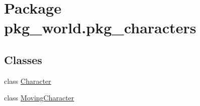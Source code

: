 \hypertarget{namespacepkg__world_1_1pkg__characters}{\section{Package pkg\-\_\-world.\-pkg\-\_\-characters}
\label{namespacepkg__world_1_1pkg__characters}
}
\subsection*{Classes}
\begin{DoxyCompactItemize}
\item 
class \hyperlink{classpkg__world_1_1pkg__characters_1_1Character}{Character}
\item 
class \hyperlink{classpkg__world_1_1pkg__characters_1_1MovingCharacter}{Moving\-Character}
\end{DoxyCompactItemize}
